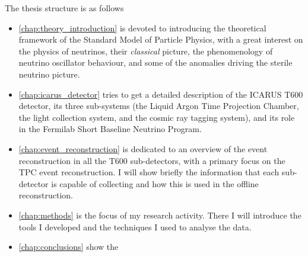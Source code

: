 The thesis structure is as follows
\begin{itemize}
    \item \autoref{chap:theory_introduction} is devoted to introducing the theoretical framework of the Standard Model of Particle Physics, with a great interest on the physics of neutrinos, their \emph{classical} picture, the phenomenology of neutrino oscillator behaviour, and some of the anomalies driving the sterile neutrino picture. 
    \item \autoref{chap:icarus_detector} tries to get a detailed description of the ICARUS T600 detector, its three sub-systems (the Liquid Argon Time Projection Chamber, the light collection system, and the cosmic ray tagging system), and its role in the Fermilab Short Baseline Neutrino Program. 
    \item \autoref{chap:event_reconstruction} is dedicated to an overview of the event reconstruction in all the T600 sub-detectors, with a primary focus on the TPC event reconstruction. I will show briefly the information that each sub-detector is capable of collecting and how this is used in the offline reconstruction. 
    \item \autoref{chap:methods} is the focus of my research activity. There I will introduce the tools I developed and the techniques I used to analyse the data. 
    \item \autoref{chap:conclusions} show the 
\end{itemize}

